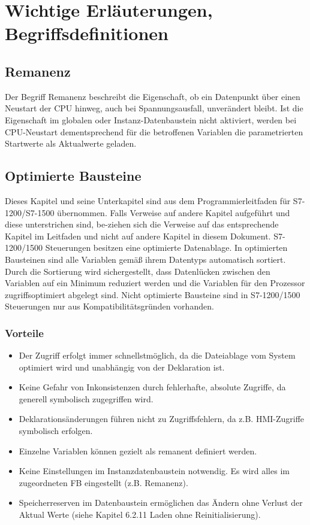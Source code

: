 \chapter{Wichtige Erläuterungen, Begriffsdefinitionen}\label{chap:Wichtige Erläuterungen, Begriffsdefinitionen}
\section{Remanenz}
Der Begriff \glqq Remanenz\grqq{} beschreibt die Eigenschaft, ob ein Datenpunkt über einen Neustart der CPU hinweg, auch bei Spannungsausfall, unverändert bleibt. Ist die Eigenschaft im globalen oder Instanz-Datenbaustein nicht aktiviert, werden bei CPU-Neustart dementsprechend für die betroffenen Variablen die parametrierten Startwerte als Aktualwerte geladen.


\clearpage
\section{Optimierte Bausteine \cite[13]{Beckhoff}}
Dieses Kapitel und seine Unterkapitel sind aus dem Programmierleitfaden für S7-1200/S7-1500 übernommen. Falls Verweise auf andere Kapitel aufgeführt und diese unterstrichen sind, be-ziehen sich die Verweise auf das entsprechende Kapitel im Leitfaden und nicht auf andere Kapitel in diesem Dokument.
S7-1200/1500 Steuerungen besitzen eine optimierte Datenablage. In optimierten Bausteinen sind alle Variablen gemäß ihrem Datentyps automatisch sortiert. Durch die Sortierung wird sichergestellt, dass Datenlücken zwischen den Variablen auf ein Minimum reduziert werden und die Variablen für den Prozessor zugriffsoptimiert abgelegt sind.  
Nicht optimierte Bausteine sind in S7-1200/1500 Steuerungen nur aus Kompatibilitätsgründen vorhanden. 

\subsection{Vorteile}
\begin{itemize}
    \item Der Zugriff erfolgt immer schnellstmöglich, da die Dateiablage vom System optimiert wird und unabhängig von der Deklaration ist.
    \item Keine Gefahr von Inkonsistenzen durch fehlerhafte, absolute Zugriffe, da generell symbolisch zugegriffen wird.
    \item Deklarationsänderungen führen nicht zu Zugriffsfehlern, da z.B. HMI-Zugriffe symbolisch erfolgen. 
    \item Einzelne Variablen können gezielt als remanent definiert werden.
    \item Keine Einstellungen im Instanzdatenbaustein notwendig. Es wird alles im zugeordneten FB eingestellt (z.B. Remanenz).
    \item Speicherreserven im Datenbaustein ermöglichen das Ändern ohne Verlust der Aktual Werte (siehe Kapitel 6.2.11 Laden ohne Reinitialisierung).
    

    \end{itemize}

